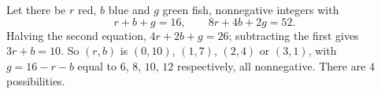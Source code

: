 Let there be $r$ red, $b$ blue and $g$ green fish, nonnegative integers with
\[r+b+g=16,\qquad8r+4b+2g=52.\]
Halving the second equation, $4r+2b+g=26$; subtracting the first gives $3r+b=10$. So $(r,b)$ is $(0,10)$, $(1,7)$, $(2,4)$ or $(3,1)$, with $g=16-r-b$ equal to $6$, $8$, $10$, $12$ respectively, all nonnegative. There are $\boxed{4}$ possibilities.
